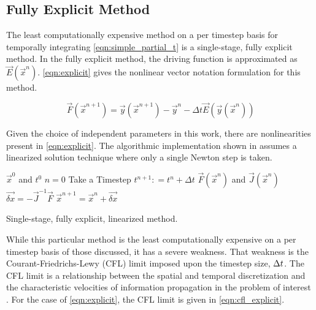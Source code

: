 \subsection{Fully Explicit Method}
\label{subsect:numerics_explicit}
The least computationally expensive method on a per timestep basis for temporally integrating \eqref{eqn:simple_partial_t} is a single-stage, fully explicit method.
In the fully explicit method, the driving function is approximated as $\vec{E}(\vec{x}^n)$.
\eqref{eqn:explicit} gives the nonlinear vector notation formulation for this method.

\begin{equation}
\label{eqn:explicit}
\vec{F}(\vec{x}^{n+1}) = \vec{y}(\vec{x}^{n+1}) - \vec{y}^{n} - \Delta t \vec{E}(\vec{y}(\vec{x}^{n}))
\end{equation}

Given the choice of independent parameters in this work, there are nonlinearities present in \eqref{eqn:explicit}.
The algorithmic implementation shown in  assumes a linearized solution technique where only a single Newton step is taken.

\begin{algo}[ht!]
\setlength{\baselineskip}{0.625\baselineskip}
\begin{algorithmic}[1]
\Require $\vec{x}^{0}$ and $t^{0}$
\Set $n = 0$
\Loop \; Take a Timestep
    \State $t^{n+1} : = t^{n} + \Delta t$
    \Calculate $\vec{F}(\vec{x}^n)$ and $\vec{J}(\vec{x}^n)$
    \Calculate $\vec{\delta x} = -\vec{J}^{-1}\vec{F}$
    \Calculate $\vec{x}^{n+1} = \vec{x}^{n} + \vec{\delta x}$ 
\end{algorithmic}
\caption{Single-stage, fully explicit, linearized method.}
\label{algo:explicit}
\end{algo}

While this particular method is the least computationally expensive on a per timestep basis of those discussed, it has a severe weakness.
That weakness is the Courant-Friedrichs-Lewy (CFL) limit imposed upon the timestep size, $\dt{}$.
The CFL limit is a relationship between the spatial and temporal discretization and the characteristic velocities of information propagation in the problem of interest \cite{LeVeque2007, Tannehill1997}.
For the case of \eqref{eqn:explicit}, the CFL limit is given in \eqref{eqn:cfl_explicit}.

